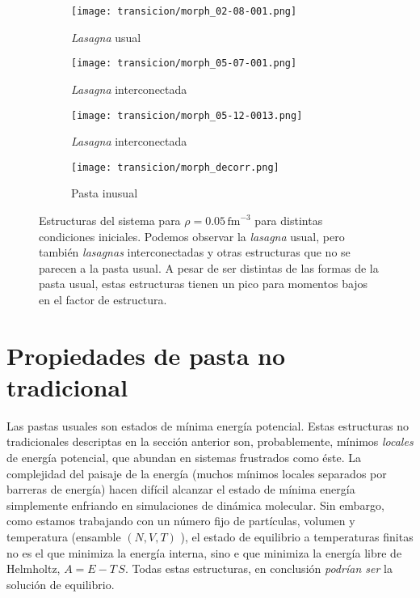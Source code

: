 \begin{figure*}[floatfix]%
  \centering
  \begin{subfigure}[h!]{0.35\columnwidth}
    \texttt{[image: transicion/morph\_02-08-001.png]}
    \caption{\emph{Lasagna} usual}
  \end{subfigure}
  \begin{subfigure}[h!]{0.35\columnwidth}
    \texttt{[image: transicion/morph\_05-07-001.png]}
    \caption{\emph{Lasagna} interconectada}
  \end{subfigure}
  \begin{subfigure}[h!]{0.35\columnwidth}
    \texttt{[image: transicion/morph\_05-12-0013.png]}
    \caption{\emph{Lasagna} interconectada}
  \end{subfigure}
  \begin{subfigure}[h!]{0.35\columnwidth}
    \texttt{[image: transicion/morph\_decorr.png]}
    \caption{Pasta inusual}
  \end{subfigure}
  \caption{Estructuras del sistema para $\rho=0.05\,\text{fm}^{-3}$ para distintas condiciones iniciales.
    Podemos observar la \emph{lasagna} usual, pero también \emph{lasagnas} interconectadas y otras estructuras que no se parecen a la pasta usual.
    A pesar de ser distintas de las formas de la pasta usual, estas estructuras tienen un pico para momentos bajos en el factor de estructura.}
  \label{fig:cool_morph}
\end{figure*}

\section{Propiedades de pasta no tradicional}
\label{unusual_pasta}

Las pastas usuales son estados de mínima energía potencial.
Estas estructuras no tradicionales descriptas en la sección anterior son, probablemente, mínimos \emph{locales} de energía potencial, que abundan en sistemas frustrados como éste.
La complejidad del paisaje de la energía (muchos mínimos locales separados por barreras de energía) hacen difícil alcanzar el estado de mínima energía simplemente enfriando en simulaciones de dinámica molecular.
Sin embargo, como estamos trabajando con un número fijo de partículas, volumen y temperatura (ensamble $(N,V,T)$
), el estado de equilibrio a temperaturas finitas no es el que minimiza la energía interna, sino e que minimiza la energía libre de Helmholtz, $A = E - T\,S$.
Todas estas estructuras, en conclusión \emph{podrían ser} la solución de equilibrio.

